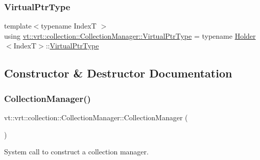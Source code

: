\subsubsection{\texorpdfstring{Virtual\+Ptr\+Type}{VirtualPtrType}}
{\footnotesize\ttfamily template$<$typename IndexT $>$ \\
using \hyperlink{structvt_1_1vrt_1_1collection_1_1_collection_manager_a086cab4af6af4f869fbf8814c3a9a6a4}{vt\+::vrt\+::collection\+::\+Collection\+Manager\+::\+Virtual\+Ptr\+Type} =  typename \hyperlink{structvt_1_1vrt_1_1collection_1_1_holder}{Holder}$<$IndexT$>$\+::\hyperlink{structvt_1_1vrt_1_1collection_1_1_collection_manager_a086cab4af6af4f869fbf8814c3a9a6a4}{Virtual\+Ptr\+Type}}



\subsection{Constructor \& Destructor Documentation}
\mbox{\label{structvt_1_1vrt_1_1collection_1_1_collection_manager_ad6c6c75f1f54ae5470847311256ae8c3}} 
\subsubsection{\texorpdfstring{Collection\+Manager()}{CollectionManager()}}
{\footnotesize\ttfamily vt\+::vrt\+::collection\+::\+Collection\+Manager\+::\+Collection\+Manager (\begin{DoxyParamCaption}{ }\end{DoxyParamCaption})}



System call to construct a collection manager. 

\mbox{\label{structvt_1_1vrt_1_1collection_1_1_collection_manager_aea0c10371b37041bcc855eef0c767b85}} 

